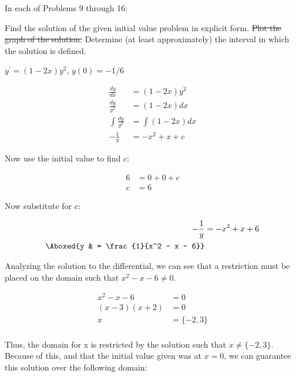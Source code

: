 \documentclass{lapchomework}
\begin{document}
\begin{instructions}
In each of Problems 9 through 16:
\begin{subinstructions}
\subinstruction Find the solution of the given initial value problem in 
explicit form.
\subinstruction \sout{Plot the graph of the solution.}
\subinstruction Determine (at least approximately) the interval in which the
solution is defined.
\end{subinstructions}

\end{instructions}

\begin{problems}

\problem [9] $y^{\prime} = (1-2x)y^2$, $y(0) = -1/6$

\begin{solution}

\step \begin{align*}
\frac{dy}{dx} & = (1-2x)y^2 \\
\frac{dy}{y^2} & = (1-2x)dx \\
\int \frac{dy}{y^2} & = \int (1-2x)dx \\
-\frac{1}{y} & = - x^2 + x + c
\end{align*}

\step Now use the initial value to find $c$:

\step \begin{align*}
6 & = 0 + 0 + c \\
c & = 6
\end{align*}

\step Now substitute for c:

\step \begin{align*}
-\frac{1}{y} & = - x^2 + x + 6 \\
\Aboxed{y & = \frac{1}{x^2 - x - 6}}
\end{align*}

\step Analyzing the solution to the differential, we can see that a restriction 
must be placed on the domain such that $x^2 - x - 6 \neq 0$. 

\step \begin{align*}
x^2 - x - 6 & = 0 \\
(x-3)(x+2) & = 0 \\
x & = \{-2,3\} \\
\end{align*}

\step Thus, the domain for x is restricted by the solution such that $x \neq 
\{-2, 3\}$. Because of this, and that the initial value given was at $x=0$, we 
can guarantee this solution over the following domain:


\end{solution}
\end{problems}
\end{document}
